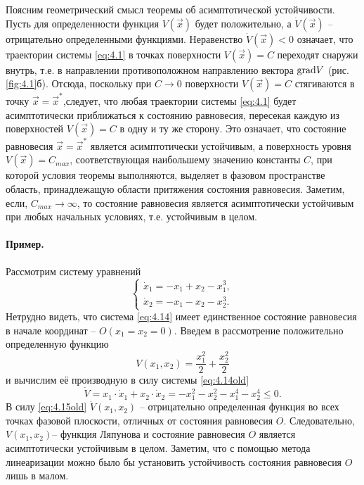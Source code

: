 Поясним геометрический смысл теоремы об асимптотической устойчивости. Пусть для определенности функция $V(\vec x)$ будет положительно, а 
$\dot V(\vec x)$ -- отрицательно определенными функциями. Неравенство $\dot V(\vec x)<0$ означает, что траектории системы \eqref{eq:4.1} в точках поверхности $V(\vec x)= C$ переходят снаружи внутрь, т.е. в направлении противоположном направлению вектора $\textrm{grad} V$ (рис.\ref{fig:4.1}б). Отсюда, поскольку при $C \to 0$ поверхности $V(\vec x) = C$ стягиваются в точку $\vec x = \vec x^*$,следует, что любая траектории системы \eqref{eq:4.1} будет асимптотически приближаться к состоянию равновесия, пересекая каждую из поверхностей $V(\vec x) = C$ в одну и ту же сторону.
Это означает, что состояние равновесия $\vec x = \vec x^*$ является асимптотически устойчивым, а поверхность уровня $V(\vec x) = C_{max}$, соответствующая наибольшему значению константы $C$, при которой условия теоремы выполняются, выделяет в фазовом пространстве область, принадлежащую области притяжения состояния равновесия. Заметим, если, $C_{max} \to \infty$, то состояние равновесия является асимптотически устойчивым при любых начальных условиях, т.е. устойчивым в целом.

\paragraph{Пример.}%
\label{par:primer_}

Рассмотрим систему уравнений
\begin{equation}
        \label{eq:4.14old}
        \begin{cases}
                \dot x_1 = -x_1+x_2- x_1^3, \\
                \dot x_2 = -x_1 - x_2 - x_2^3.
        \end{cases}
\end{equation}
Нетрудно видеть, что система \eqref{eq:4.14} имеет единственное состояние равновесия в начале координат -- $O(x_1=x_2=0)$. Введем в рассмотрение положительно определенную функцию
\begin{equation}
        \label{eq:}
        V(x_1,x_2) = \frac{x_1^2}{2} + \frac{x_2^2}{2}
\end{equation}
и вычислим её производную в силу системы \eqref{eq:4.14old}
\begin{equation}
        \label{eq:4.15old}
       \dot V = x_1 \cdot \dot x_1 + x_2 \cdot \dot x_2 = -x_1^2 - x_2^2 - x_1^4 - x_2^4 \leq 0. 
\end{equation}
В силу \eqref{eq:4.15old} $\dot V( x_1,x_2)$ -- отрицательно определенная функция во всех точках фазовой плоскости, отличных от состояния равновесия $O$. Следовательно, $V(x_1,x_2)$-- функция Ляпунова и состояние равновесия
$O$ является асимптотически устойчивым в целом.
Заметим, что с помощью метода линеаризации можно было бы установить устойчивость состояния равновесия $O$ лишь в малом.

